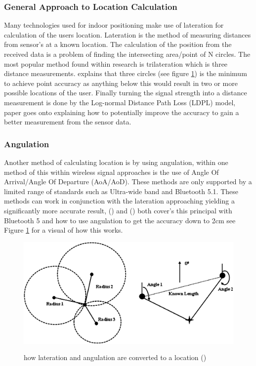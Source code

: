 \subsubsection{General Approach to Location Calculation}
Many technologies used for indoor positioning make use of lateration for calculation of the users location. Lateration is the method of measuring distances from sensor's at a known location. The calculation of the position from the received data is a problem of finding the intersecting area/point of N circles. The most popular method found within research is trilateration which is three distance measurements. \cite{shchekotov_2015_indoor} explains that three circles (see figure \ref{fig:latandang}) is the minimum to achieve point accuracy as anything below this would result in two or more possible locations of the user. Finally turning the signal strength into a distance measurement is done by the Log-normal Distance Path Loss (LDPL) model, \cite{yang_2018_an} paper goes onto explaining how to potentially improve the accuracy to gain a better measurement from the sensor data.
 
\subsubsection{Angulation}
Another method of calculating location is by using angulation, within one method of this within wireless signal approaches is the use of Angle Of Arrival/Angle Of Departure (AoA/AoD). These methods are only supported by a limited range of standards such as Ultra-wide band and Bluetooth 5.1. These methods can work in conjunction with the lateration approaching yielding a significantly more accurate result, (\cite{mysticmedia_2020_the}) and (\cite{lehtimki_bluetooth}) both cover's this principal with Bluetooth 5 and how to use angulation to get the accuracy down to 2cm see Figure \ref{fig:latandang} for a visual of how this works.

\begin{figure}[h]
	\includegraphics[width=\linewidth]{images/research/distanceandaoa.png}\\
	\caption{how lateration and angulation are converted to a location (\cite{kim_2013_rfidbased})}
	\label{fig:latandang}
\end{figure}

